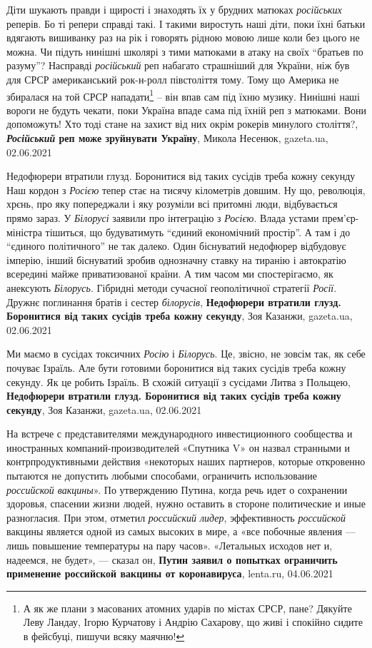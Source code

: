 Діти шукають правди і щирості і знаходять їх у брудних матюках
\emph{російських} реперів. Бо ті репери справді такі. І такими виростуть наші
діти, поки їхні батьки вдягають вишиванку раз на рік і говорять рідною мовою
лише коли без цього не можна. Чи підуть нинішні школярі з тими матюками в атаку
на своїх \enquote{братьев по разуму}?  Насправді \emph{російський} реп набагато
страшніший для України, ніж був для СРСР американський рок-н-ролл півстоліття
тому. Тому що Америка не збиралася на той СРСР нападати\footnote{А як же плани
з масованих атомних ударів по містах СРСР, пане? Дякуйте Леву Ландау, Ігорю
Курчатову і Андрію Сахарову, що живі і спокійно сидите в фейсбуці, пишучи всяку
маячню!} – він впав сам під їхню музику. Нинішні наші вороги не будуть чекати,
поки Україна впаде сама під їхній реп з матюками. Вони допоможуть! Хто тоді
стане на захист від них окрім рокерів минулого століття?,
\textbf{\emph{Російський} реп може зруйнувати Україну},
Микола Несенюк, gazeta.ua, 02.06.2021

Недофюрери втратили глузд. Боронитися від таких сусідів треба кожну секунду
Наш кордон з \emph{Росією} тепер стає на тисячу кілометрів довшим. Ну що, революція,
хрєнь, про яку попереджали і яку розуміли всі притомні люди, відбувається
прямо зараз. У \emph{Білорусі} заявили про інтеграцію з \emph{Росією}. Влада устами
прем'єр-міністра тішиться, що будуватимуть \enquote{єдиний економічний простір}. А там
і до \enquote{єдиного політичного} не так далеко. Один біснуватий недофюрер
відбудовує імперію, інший біснуватий зробив однозначну ставку на тиранію і
автократію всередині майже приватизованої країни. А тим часом ми
спостерігаємо, як анексують \emph{Білорусь}. Гібридні методи сучасної геополітичної
стратегії \emph{Росії}. Дружнє поглинання братів і сестер \emph{білорусів},
\textbf{Недофюрери втратили глузд. Боронитися від таких сусідів треба кожну секунду},
Зоя Казанжи, gazeta.ua, 02.06.2021

Ми маємо в сусідах токсичних \emph{Росію} і \emph{Білорусь}. Це, звісно, не
зовсім так, як себе почуває Ізраїль. Але бути готовими боронитися від таких
сусідів треба кожну секунду. Як це робить Ізраїль. В схожій ситуації з сусідами
Литва з Польщею,
\textbf{Недофюрери втратили глузд. Боронитися від таких сусідів треба кожну секунду},
Зоя Казанжи, gazeta.ua, 02.06.2021

На встрече с представителями международного инвестиционного сообщества и
иностранных компаний-производителей «Спутника V» он назвал странными и
контрпродуктивными действия «некоторых наших партнеров, которые откровенно
пытаются не допустить любыми способами, ограничить использование \emph{российской
вакцины}». По утверждению Путина, когда речь идет о сохранении здоровья,
спасении жизни людей, нужно оставить в стороне политические и иные разногласия.
При этом, отметил \emph{российский лидер}, эффективность \emph{российской} вакцины является
одной из самых высоких в мире, а «все побочные явления — лишь повышение
температуры на пару часов». «Летальных исходов нет и, надеемся, не будет», —
сказал он,
\textbf{Путин заявил о попытках ограничить применение российской вакцины от коронавируса},
lenta.ru, 04.06.2021

